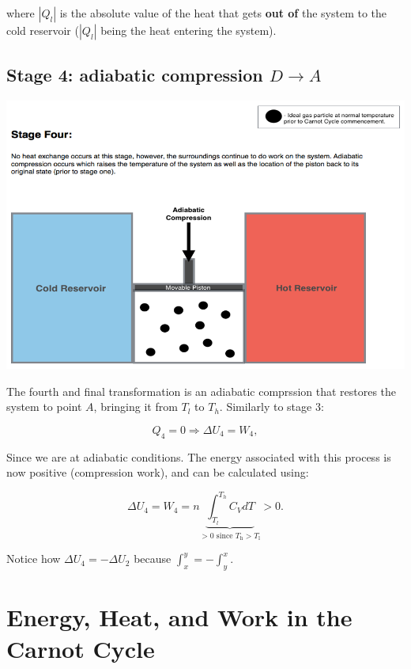 \documentclass[
  9pt,
]{extbook}
\theoremstyle{definition}
\theoremstyle{definition}
\theoremstyle{definition}
\theoremstyle{remark}
\begin{document}
where \(\left| Q_l \right|\) is the absolute value of the heat that gets \textbf{out of} the system to the cold reservoir (\(\left| Q_l \right|\) being the heat entering the system).

\hypertarget{CCstage4}{%
\subsection{\texorpdfstring{Stage 4: adiabatic compression \(D \rightarrow A\)}{Stage 4: adiabatic compression D \textbackslash rightarrow A}}\label{CCstage4}}

\begin{center}\includegraphics[width=0.7\linewidth]{./img/OEP_Figures.007d} \end{center}

The fourth and final transformation is an adiabatic comprssion that restores the system to point \(A\), bringing it from \(T_l\) to \(T_h\). Similarly to stage 3:

\begin{equation}
Q_4 = 0 \Rightarrow \Delta U_4 = W_4,
  \label{eq:CCst4}
\end{equation}

Since we are at adiabatic conditions. The energy associated with this process is now positive (compression work), and can be calculated using:

\begin{equation}
\Delta U_4 = W_4 = n \underbrace{\int_{T_l}^{T_h} C_V dT}_{>0 \text{ since } T_\mathrm{h}>T_\mathrm{l}} > 0.
  \label{eq:CCst4b}
\end{equation}

Notice how \(\Delta U_4 = - \Delta U_2\) because \(\int_x^y=-\int_y^x\).

\hypertarget{UWQCarnot}{%
\section{Energy, Heat, and Work in the Carnot Cycle}\label{UWQCarnot}}
\end{document}
